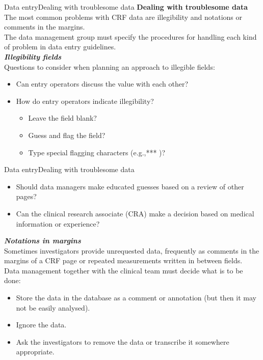 \documentclass[xcolor=dvipsnames,11pt]{beamer}
\begin{document}
\begin{frame}[fragile]{Data entry}{Dealing with troublesome data}
	\textbf{Dealing with troublesome data}\\
	\bigskip
	The most common problems with CRF data are illegibility and notations or comments in the margins.\\
	\bigskip
	The data management group must specify the procedures for handling each kind of problem in data entry guidelines.\\
	\bigskip
	\textbf{\textit{Illegibility fields}}\\
	\medskip
	Questions to consider when planning an approach to illegible fields:
	\begin{itemize}
		\item Can entry operators discuss the value with each other?
		\item How do entry operators indicate illegibility?
		\begin{itemize}
			\item Leave the field blank?
			\item Guess and flag the field?
			\item Type special flagging characters (e.g.,*** )?
		\end{itemize}
	\end{itemize}
\end{frame}

\begin{frame}[fragile]{Data entry}{Dealing with troublesome data}
	\begin{itemize}
		\item Should data managers make educated guesses based on a review of other pages?
		\item Can the clinical research associate (CRA) make a decision based on medical information or experience?
	\end{itemize}
	\bigskip
	\textbf{\textit{Notations in margins}}\\
	\medskip
	Sometimes investigators provide unrequested data, frequently as comments in the margins of a CRF page or repeated measurements written in between fields.\\
	\medskip
	Data management together with the clinical team must decide what is to be done:
	\begin{itemize}
		\item Store the data in the database as a comment or annotation (but then it may not be easily analysed).
		\item Ignore the data.
		\item Ask the investigators to remove the data or transcribe it somewhere appropriate. 	
	\end{itemize}
\end{frame}
\end{document}
